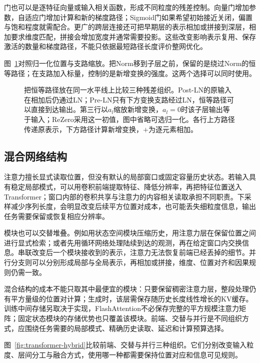 门也可以是逐特征向量或输入相关函数，形成不同粒度的残差控制。向量门增加参数，自适应门增加计算和新的梯度路径；Sigmoid门如果希望初始接近关闭，偏置与饱和程度就需配合。更广的跨层连接还可把早期层的表示相加或拼接到深层，相加要求维度匹配，拼接会增加宽度并通常需要投影。这些改变影响表示复用、保存激活的数量和梯度路径，不能只依据最短路径长度评价整网优化。

图~\ref{fig:transformer-residual-extensions}对照归一化位置与支路缩放。把Norm移到子层之前，保留的是绕过Norm的恒等路径；在支路加入标量，控制的是新增变换的强度。这两个选择可以同时使用。

\begin{figure}[htbp]
  \centering
  
  \caption{把恒等路径放在同一水平线上比较三种残差组织。Post-LN的原输入在相加后仍通过LN；Pre-LN只有下方变换支路经过LN，恒等路径可以直接到达输出。第三行以$a_l$缩放新增变换，$a_l=0$时该子层输出等于输入；ReZero采用这一初值，图中省略可选归一化。各行上方路径传递原表示，下方路径计算新增变换，$+$为逐元素相加。}
  \label{fig:transformer-residual-extensions}
\end{figure}
\FloatBarrier

\subsection{混合网络结构}
\label{sec:transformer-hybrid}

注意力擅长显式读取位置，但没有默认的局部窗口或固定容量历史状态。若输入具有稳定局部模式，可以用卷积前端提取特征、降低分辨率，再把特征位置送入Transformer；窗口内部的卷积共享与注意力的内容相关读取承担不同职责。下采样减少序列长度，会明显改变后续平方位置对成本，也可能丢失细粒度信息，输出任务需要保留或恢复相应分辨率。

模块也可以交替堆叠。例如用状态空间模块压缩历史，用注意力层在保留位置之间进行显式检索；或者先用循环网络处理陆续到达的观测，再在给定窗口内交换信息。串联改变后一个模块接收到的表示，注意力无法恢复前端已经丢掉的细节。并行分支则可以分别形成局部与全局表示，再相加或拼接，维度、位置对齐和因果规则仍需一致。

混合结构的成本不能只取其中最便宜的模块：只要保留稠密注意力层，整段处理仍有平方量级的位置对计算；生成时，该层需保存随历史长度线性增长的KV缓存。训练中间存储另取决于实现，FlashAttention不必保存完整的平方规模注意力矩阵；固定状态模块的存储优势也只覆盖该模块。前端、交替与并行是不同组织方式，应围绕任务需要的局部模式、精确历史读取、延迟和计算预算选择。

图~\ref{fig:transformer-hybrid}比较前端、交替与并行三种组织。它们分别改变输入粒度、层间分工与融合方式，使用哪一种都需要保持位置对应和信息可见规则。

